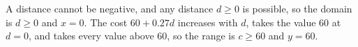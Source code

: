A distance cannot be negative, and any distance $d\ge0$ is possible, so the domain is $d\ge0$ and $x=\boxed{0}$. The cost $60+0.27d$ increases with $d$, takes the value $60$ at $d=0$, and takes every value above $60$, so the range is $c\ge60$ and $y=\boxed{60}$.
